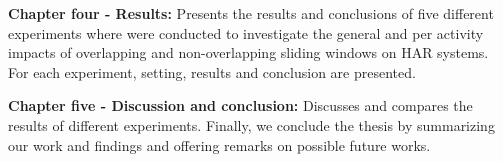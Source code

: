 \noindent\textbf{Chapter four - Results:}
Presents the results and conclusions of five different experiments where were conducted to investigate the general and per activity impacts of overlapping and non-overlapping sliding windows on HAR systems. For each experiment, setting, results and conclusion are presented.

\noindent\textbf{Chapter five - Discussion and conclusion:}
Discusses and compares the results of different experiments. Finally, we conclude the thesis by summarizing our work and findings and offering remarks on possible future works.   

 
        


        